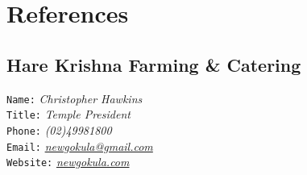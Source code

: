 \documentclass[12pt,a4paper,oneside]{article}
\begin{document}

\newpage
\section{References}
\subsection{Hare Krishna Farming \& Catering}
\texttt{Name\phantom{...}:} \textit{\color{s}Christopher Hawkins}
\\\texttt{Title\phantom{..}:} \textit{\color{s}Temple President}
\\\texttt{Phone\phantom{..}:} \textit{\color{s}(02)49981800}
\\\texttt{Email\phantom{..}:} \textit{\color{s}\href{mailto:newgokula@gmail.com?Subject=Shyam}{newgokula@gmail.com}}
\\\texttt{Website:} \textit{\color{s}\href{http://www.newgokula.com/}{newgokula.com}}
\addtocounter{subsection}{1}
{}
\addtocounter{subsection}{-1}
\end{document}
